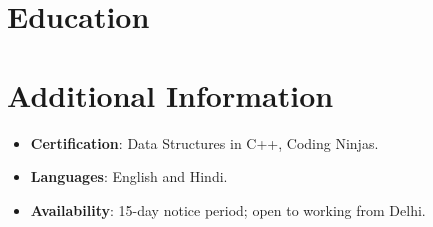 \documentclass[11pt,a4paper,sans]{moderncv}
\begin{document}
\section{Education}
\vspace{1pt}


\section{Additional Information}
\vspace{1pt}
\begin{itemize}
\item {\textbf{Certification}: Data Structures in C++, Coding Ninjas.}
\item {\textbf{Languages}: English and Hindi.}
\item {\textbf{Availability}: 15-day notice period; open to working from Delhi.}
\end{itemize}
\end{document}
